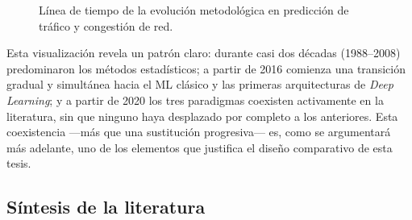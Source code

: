\documentclass[12pt]{report}
\begin{document}
\begin{figure}[H]
    \caption{Línea de tiempo de la evolución metodológica en predicción de tráfico y congestión de red.}
    \label{fig:linea_tiempo}
\end{figure}

Esta visualización revela un patrón claro: durante casi dos décadas (1988--2008) predominaron los métodos estadísticos; a partir de 2016 comienza una transición gradual y simultánea hacia el ML clásico y las primeras arquitecturas de \textit{Deep Learning}; y a partir de 2020 los tres paradigmas coexisten activamente en la literatura, sin que ninguno haya desplazado por completo a los anteriores. Esta coexistencia ---más que una sustitución progresiva--- 
es, como se argumentará más adelante, uno de los elementos que justifica el diseño comparativo de esta tesis.

\subsection*{Síntesis de la literatura}
\end{document}
